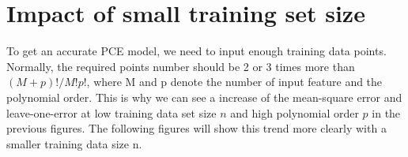 \documentclass[a4paper,12pt]{article} %
\begin{document}
\section{Impact of small training set size}
To get an accurate PCE model, we need to input enough training data points.  Normally, the required points number should be 2 or 3 times more than $(M+p)!/M!p!$, where M and p denote the number of input feature and the polynomial order.  This is why we can see a increase of the mean-square error and leave-one-error at low training data set size $n$ and high polynomial order $p$ in the previous figures. The following figures will show this trend more clearly with a smaller training data size n.\\
\begin{center}
\end{center}

\begin{center}
\end{center}
\end{document}
